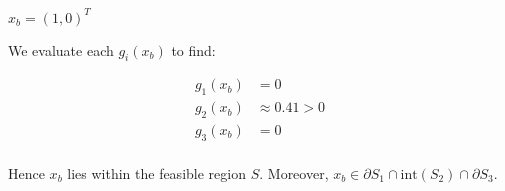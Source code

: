 $ x_b = \left(1, 0\right)^T$

\begin{solution}
  We evaluate each $g_i(x_b)$ to find:

  \begin{align*}
    g_1(x_b) &= 0 \\
    g_2(x_b) &\approx 0.41 > 0 \\
    g_3(x_b) &= 0 \\
  \end{align*}

  Hence $x_b$ lies within the feasible region $S$. Moreover, $x_b \in \partial S_1 \cap \text{int}(S_2) \cap \partial S_3 $.
  \ \\
\end{solution}